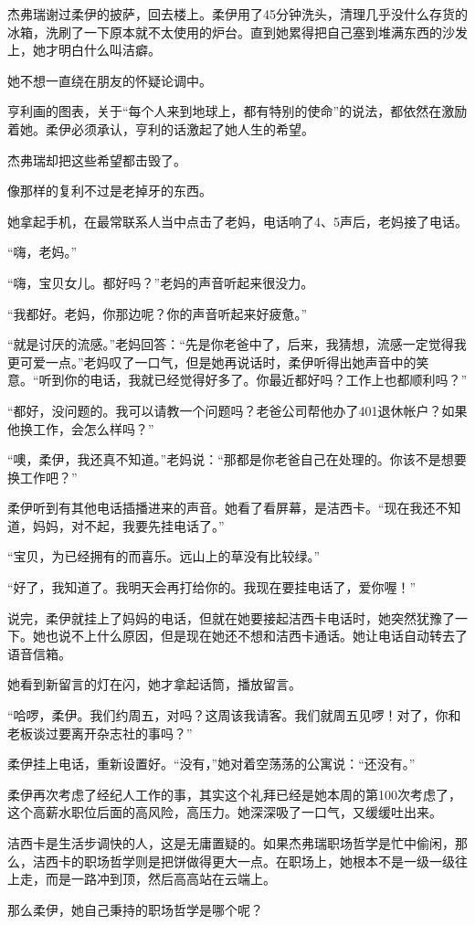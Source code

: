 杰弗瑞谢过柔伊的披萨，回去楼上。柔伊用了45分钟洗头，清理几乎没什么存货的冰箱，洗刷了一下原本就不太使用的炉台。直到她累得把自己塞到堆满东西的沙发上，她才明白什么叫洁癖。

她不想一直绕在朋友的怀疑论调中。

亨利画的图表，关于“每个人来到地球上，都有特别的使命”的说法，都依然在激励着她。柔伊必须承认，亨利的话激起了她人生的希望。

杰弗瑞却把这些希望都击毁了。

像那样的复利不过是老掉牙的东西。

她拿起手机，在最常联系人当中点击了老妈，电话响了4、5声后，老妈接了电话。

“嗨，老妈。”

“嗨，宝贝女儿。都好吗？”老妈的声音听起来很没力。

“我都好。老妈，你那边呢？你的声音听起来好疲惫。”

“就是讨厌的流感。”老妈回答：“先是你老爸中了，后来，我猜想，流感一定觉得我更可爱一点。”老妈叹了一口气，但是她再说话时，柔伊听得出她声音中的笑意。“听到你的电话，我就已经觉得好多了。你最近都好吗？工作上也都顺利吗？”

“都好，没问题的。我可以请教一个问题吗？老爸公司帮他办了401退休帐户？如果他换工作，会怎么样吗？”

“噢，柔伊，我还真不知道。”老妈说：“那都是你老爸自己在处理的。你该不是想要换工作吧？”

柔伊听到有其他电话插播进来的声音。她看了看屏幕，是洁西卡。“现在我还不知道，妈妈，对不起，我要先挂电话了。”

“宝贝，为已经拥有的而喜乐。远山上的草没有比较绿。”

“好了，我知道了。我明天会再打给你的。我现在要挂电话了，爱你喔！”

说完，柔伊就挂上了妈妈的电话，但就在她要接起洁西卡电话时，她突然犹豫了一下。她也说不上什么原因，但是现在她还不想和洁西卡通话。她让电话自动转去了语音信箱。

她看到新留言的灯在闪，她才拿起话筒，播放留言。

“哈啰，柔伊。我们约周五，对吗？这周该我请客。我们就周五见啰！对了，你和老板谈过要离开杂志社的事吗？”

柔伊挂上电话，重新设置好。“没有，”她对着空荡荡的公寓说：“还没有。”

柔伊再次考虑了经纪人工作的事，其实这个礼拜已经是她本周的第100次考虑了，这个高薪水职位后面的高风险，高压力。她深深吸了一口气，又缓缓吐出来。

洁西卡是生活步调快的人，这是无庸置疑的。如果杰弗瑞职场哲学是忙中偷闲，那么，洁西卡的职场哲学则是把饼做得更大一点。在职场上，她根本不是一级一级往上走，而是一路冲到顶，然后高高站在云端上。

那么柔伊，她自己秉持的职场哲学是哪个呢？
